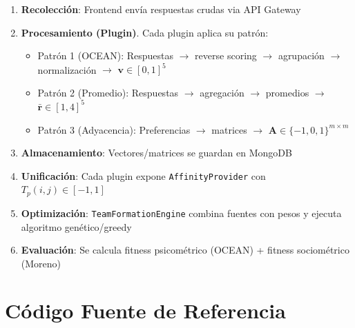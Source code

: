 \documentclass[12pt,a4paper]{article}
\begin{document}
\begin{enumerate}
    \item \textbf{Recolección}: Frontend envía respuestas crudas via API Gateway
    
    \item \textbf{Procesamiento (Plugin)}. Cada plugin aplica su patrón:
    \begin{itemize}
        \item Patrón 1 (OCEAN): Respuestas $\to$ reverse scoring $\to$ agrupación $\to$ normalización $\to$ $\mathbf{v} \in [0,1]^5$
        \item Patrón 2 (Promedio): Respuestas $\to$ agregación $\to$ promedios $\to$ $\mathbf{\bar{r}} \in [1,4]^5$
        \item Patrón 3 (Adyacencia): Preferencias $\to$ matrices $\to$ $\mathbf{A} \in \{-1,0,1\}^{m \times m}$
    \end{itemize}
    
    \item \textbf{Almacenamiento}: Vectores/matrices se guardan en MongoDB
    
    \item \textbf{Unificación}: Cada plugin expone \texttt{AffinityProvider} con $T_p(i,j) \in [-1, 1]$
    
    \item \textbf{Optimización}: \texttt{TeamFormationEngine} combina fuentes con pesos y ejecuta algoritmo genético/greedy
    
    \item \textbf{Evaluación}: Se calcula fitness psicométrico (OCEAN) + fitness sociométrico (Moreno)
\end{enumerate}

\section{Código Fuente de Referencia}
\label{sec:code}
\end{document}

